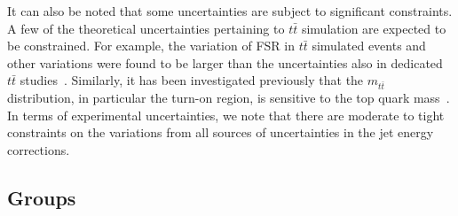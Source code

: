 It can also be noted that some uncertainties are subject to significant constraints.
A few of the theoretical uncertainties pertaining to $t\bar t$ simulation are expected to be constrained.
For example, the variation of FSR in $t\bar t$ simulated events and other variations were found to be larger than the uncertainties also in dedicated $t\bar t$ studies~\cite{CMS-PAS-TOP-16-021}.
Similarly, it has been investigated previously that the $m_{t\bar t}$ distribution, in particular the turn-on region, is sensitive to the top quark mass~\cite{CMS_AN_2008_21}.
In terms of experimental uncertainties, we note that there are moderate to tight constraints on the variations from all sources of uncertainties in the jet energy corrections. 


\subsection{Groups}
\label{sec:group_unc}

